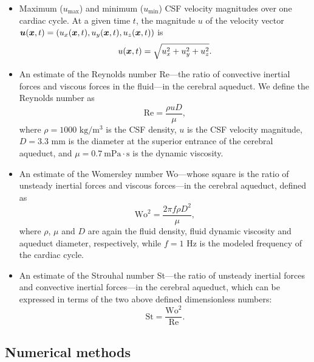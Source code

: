 \documentclass{template}
\begin{document}
\begin{itemize}
    \item Maximum ($u_{\mathrm{max}}$) and minimum ($u_{\mathrm{min}}$)
    CSF velocity magnitudes over one cardiac cycle.
    At a given time $t$, the magnitude $u$ of the velocity vector
    $\bm{u}(\bm{x}, t) = (u_x(\bm{x}, t), u_y(\bm{x}, t), u_z(\bm{x}, t))$ is 
    $$ u(\bm{x}, t) = \sqrt{u_{x}^2 + u_{y}^2 + u_{z}^2}. $$

    \item An estimate of the Reynolds number Re---the ratio of convective inertial forces and
    viscous forces in the fluid---in the cerebral aqueduct. We define the Reynolds number as
    \begin{equation}
        \mathrm{Re} = \frac{\rho uD}{\mu},
        \label{eq:reynolds_number}
    \end{equation}
    where $\rho = 1000$ $\mathrm{kg/m^3}$ is the CSF density,
    $u$ is the CSF velocity magnitude, $D = 3.3$ mm is the diameter at the superior
    entrance of the cerebral aqueduct, and $\mu = 0.7 \ \mathrm{mPa\cdot s}$ is the dynamic viscosity.

    \item An estimate of the Womersley number Wo---whose square is the ratio of
    unsteady inertial forces and viscous forces---in the cerebral aqueduct, defined as
    \begin{equation}
        \mathrm{Wo}^2 = \frac{2\pi f\rho D^2}{\mu},
        \label{eq:womersley_number}
    \end{equation}
    where $\rho$, $\mu$ and $D$ are again the fluid density, fluid dynamic viscosity
    and aqueduct diameter, respectively, while $f = 1$ Hz is
    the modeled frequency of the cardiac cycle.

    \item An estimate of the Strouhal number St---the ratio of unsteady inertial forces
    and convective inertial forces---in the cerebral aqueduct, which can be 
    expressed in terms of the two above defined dimensionless numbers:
    \begin{equation}
        \mathrm{St} = \frac{\mathrm{Wo}^2}{\mathrm{Re}}.
        \label{eq:strouhal_number}
    \end{equation}
\end{itemize}

\subsection{Numerical methods}
\label{sec:numerical_methods}
\end{document}
